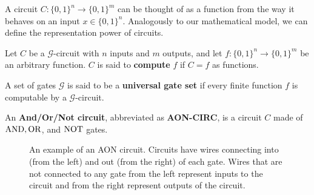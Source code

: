   A circuit $C: \{0, 1\}^n \to \{0, 1\}^m$ can be thought of as a function from the way it behaves on an input $x \in \{0, 1\}^n$. Analogously to our mathematical model, we can define the representation power of circuits. 

  \begin{definition}
    \label{def:computability-of-circuits}
    Let $C$ be a $\mathcal{G}$-circuit with $n$ inputs and $m$ outputs, and let $f: \{0, 1\}^n \to \{0, 1\}^m$ be an arbitrary function. $C$ is said to \textbf{compute} $f$ if $C = f$ as functions. 
  \end{definition}

  \begin{definition}
    \label{def:universal-gate-set}
    A set of gates $\mathcal{G}$ is said to be a \textbf{universal gate set} if every finite function $f$ is computable by a $\mathcal{G}$-circuit. 
  \end{definition}

  \begin{definition}
    \label{def:aon-circ}
    An \textbf{And/Or/Not circuit}, abbreviated as \textbf{AON-CIRC}, is a circuit $C$ made of $\operatorname{AND}, \operatorname{OR}$, and $\operatorname{NOT}$ gates. 

    \begin{figure}[H]
      \centering 
      \caption{An example of an AON circuit. Circuits have wires connecting into (from the left) and out (from the right) of each gate. Wires that are not connected to any gate from the left represent inputs to the circuit and from the right represent outputs of the circuit. } 
      \label{fig:aon-circ}
    \end{figure}
  \end{definition}

